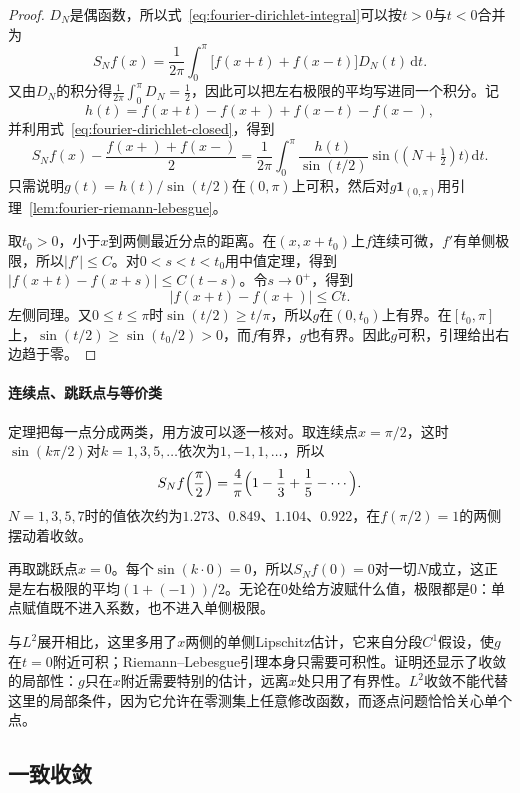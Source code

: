 \begin{proof}
$D_N$是偶函数，所以式~\eqref{eq:fourier-dirichlet-integral}可以按$t>0$与$t<0$合并为
\[
S_Nf(x)=\frac1{2\pi}\int_0^{\pi}\bigl[f(x+t)+f(x-t)\bigr]D_N(t)\,\mathrm dt.
\]
又由$D_N$的积分得$\frac1{2\pi}\int_0^{\pi}D_N=\frac12$，因此可以把左右极限的平均写进同一个积分。记
\[
h(t)=f(x+t)-f(x+)+f(x-t)-f(x-),
\]
并利用式~\eqref{eq:fourier-dirichlet-closed}，得到
\[
S_Nf(x)-\frac{f(x+)+f(x-)}2=\frac1{2\pi}\int_0^{\pi}\frac{h(t)}{\sin(t/2)}\sin\bigl((N+\tfrac12)t\bigr)\,\mathrm dt.
\]
只需说明$g(t)=h(t)/\sin(t/2)$在$(0,\pi)$上可积，然后对$g\mathbf 1_{(0,\pi)}$用引理~\ref{lem:fourier-riemann-lebesgue}。

取$t_0>0$，小于$x$到两侧最近分点的距离。在$(x,x+t_0)$上$f$连续可微，$f'$有单侧极限，所以$\lvert f'\rvert\leq C$。对$0<s<t<t_0$用中值定理，得到$\lvert f(x+t)-f(x+s)\rvert\leq C(t-s)$。令$s\to0^+$，得到
\[
\lvert f(x+t)-f(x+)\rvert\leq Ct.
\]
左侧同理。又$0\leq t\leq\pi$时$\sin(t/2)\geq t/\pi$，所以$g$在$(0,t_0)$上有界。在$[t_0,\pi]$上，$\sin(t/2)\geq\sin(t_0/2)>0$，而$f$有界，$g$也有界。因此$g$可积，引理给出右边趋于零。
\end{proof}

\paragraph{连续点、跳跃点与等价类}

定理把每一点分成两类，用方波可以逐一核对。取连续点$x=\pi/2$，这时$\sin(k\pi/2)$对$k=1,3,5,\ldots$依次为$1,-1,1,\ldots$，所以
\[
S_Nf\Bigl(\frac\pi2\Bigr)=\frac4\pi\Bigl(1-\frac13+\frac15-\cdots\Bigr).
\]
$N=1,3,5,7$时的值依次约为$1.273$、$0.849$、$1.104$、$0.922$，在$f(\pi/2)=1$的两侧摆动着收敛。

再取跳跃点$x=0$。每个$\sin(k\cdot0)=0$，所以$S_Nf(0)=0$对一切$N$成立，这正是左右极限的平均$(1+(-1))/2$。无论在$0$处给方波赋什么值，极限都是$0$：单点赋值既不进入系数，也不进入单侧极限。

与$L^2$展开相比，这里多用了$x$两侧的单侧Lipschitz估计，它来自分段$C^1$假设，使$g$在$t=0$附近可积；Riemann--Lebesgue引理本身只需要可积性。证明还显示了收敛的局部性：$g$只在$x$附近需要特别的估计，远离$x$处只用了有界性。$L^2$收敛不能代替这里的局部条件，因为它允许在零测集上任意修改函数，而逐点问题恰恰关心单个点。

\subsection{一致收敛}
\label{sec:fourier-series-uniform}


